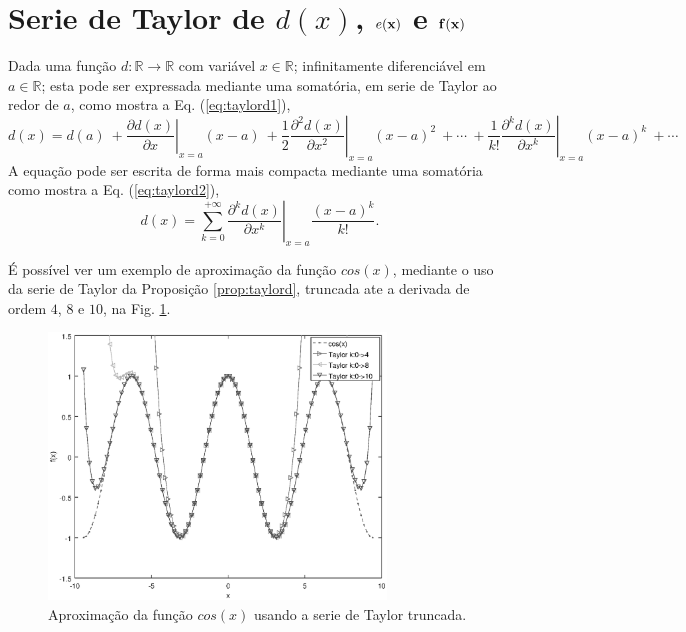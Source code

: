 \section{Serie de Taylor de $d(x)$, $e(\VECTOR{x})$ e $\VECTOR{f}(\VECTOR{x})$}
\label{def:taylor}


\begin{proposition}\label{prop:taylord}
Dada uma função $d:\mathbb{R}\rightarrow \mathbb{R}$ com variável $x \in \mathbb{R}$;
infinitamente diferenciável em $a \in \mathbb{R}$;
esta pode ser expressada mediante uma somatória, em serie de Taylor 
\cite[pp. 764]{stewart2008calculus} \cite[pp. 281]{telles2015matematica} \cite{Taylor} 
ao redor de $a$, como
mostra a Eq. (\ref{eq:taylord1}),
\begin{equation}\label{eq:taylord1}
  d(x)=d(a)
      ~+\left.\frac{\partial   d(x)}{\partial x  }\right|_{x=a}(x-a)
      ~+\frac{1}{2}\left.\frac{\partial^2 d(x)}{\partial x^2}\right|_{x=a}(x-a)^{2}
      ~+\cdots 
      ~+\frac{1}{k!}\left.\frac{\partial^k d(x)}{\partial x^k}\right|_{x=a}(x-a)^{k}
      ~+\cdots 
\end{equation}
A equação pode ser escrita de forma mais compacta mediante uma somatória  como mostra a Eq. (\ref{eq:taylord2}),
\begin{equation}\label{eq:taylord2}
  d(x)=\sum\limits_{k=0}^{+\infty} \left.\frac{\partial^k d(x)}{\partial x^k}\right|_{x=a}\frac{(x-a)^{k}}{k!}.
\end{equation}
\end{proposition}

É possível ver um exemplo de aproximação da função $cos(x)$, 
mediante o uso da serie de Taylor da Proposição \ref{prop:taylord}, 
truncada ate a derivada de ordem $4$, $8$ e $10$, na Fig. \ref{fig:taylore}.
\begin{figure}[!h]
  \centering
    \includegraphics[width=0.8\textwidth]{chapters/funcoes/mcode/taylore.eps}
  \caption{Aproximação da função $cos(x)$ usando a serie de Taylor truncada.}
    \label{fig:taylore}
\end{figure}
 
